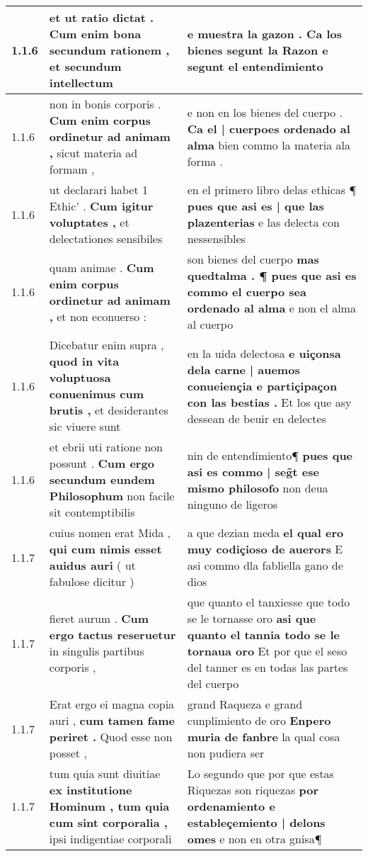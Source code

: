 \begin{tabular}{|p{1cm}|p{6.5cm}|p{6.5cm}|}
1.1.6 & et ut ratio dictat . \textbf{ Cum enim bona secundum rationem , } et secundum intellectum & e muestra la gazon . \textbf{ Ca los bienes segunt la Razon } e segunt el entendimiento \\\hline
1.1.6 & non in bonis corporis . \textbf{ Cum enim corpus ordinetur ad animam , } sicut materia ad formam , & e non en los bienes del cuerpo . \textbf{ Ca el | cuerpoes ordenado al alma } bien commo la materia ala forma . \\\hline
1.1.6 & ut declarari habet 1 Ethic’ . \textbf{ Cum igitur voluptates , } et delectationes sensibiles & en el primero libro delas ethicas ¶ \textbf{ pues que asi es | que las plazenterias } e las delecta con nessensibles \\\hline
1.1.6 & quam animae . \textbf{ Cum enim corpus ordinetur ad animam , } et non econuerso : & son bienes del cuerpo \textbf{ mas quedtalma . ¶ pues que asi es commo el cuerpo sea ordenado al alma } e non el alma al cuerpo \\\hline
1.1.6 & Dicebatur enim supra , \textbf{ quod in vita voluptuosa conuenimus cum brutis , } et desiderantes sic viuere sunt & en la uida delectosa \textbf{ e uiçonsa dela carne | auemos conueiençia e partiçipaçon con las bestias . } Et los que asy dessean de beuir en delectes \\\hline
1.1.6 & et ebrii uti ratione non possunt . \textbf{ Cum ergo secundum eundem Philosophum } non facile sit contemptibilis & nin de entendimiento¶ \textbf{ pues que asi es commo | seg̃t ese mismo philosofo } non deua ninguno de ligeros \\\hline
1.1.7 & cuius nomen erat Mida , \textbf{ qui cum nimis esset auidus auri } ( ut fabulose dicitur ) & a que dezian meda \textbf{ el qual ero muy codiçioso de auerors } E asi commo dla fabliella gano de dios \\\hline
1.1.7 & fieret aurum . \textbf{ Cum ergo tactus reseruetur } in singulis partibus corporis , & que quanto el tanxiesse que todo se le tornasse oro \textbf{ asi que quanto el tannia todo se le tornaua oro } Et por que el seso del tanner es en todas las partes del cuerpo \\\hline
1.1.7 & Erat ergo ei magna copia auri , \textbf{ cum tamen fame periret . } Quod esse non posset , & grand Raqueza e grand cunplimiento de oro \textbf{ Enpero muria de fanbre } la qual cosa non pudiera ser \\\hline
1.1.7 & tum quia sunt diuitiae \textbf{ ex institutione Hominum , tum quia cum sint corporalia , } ipsi indigentiae corporali & Lo segundo que por que estas Riquezas son riquezas \textbf{ por ordenamiento e estableçemiento | delons omes } e non en otra gnisa¶ \\\hline

\end{tabular}
